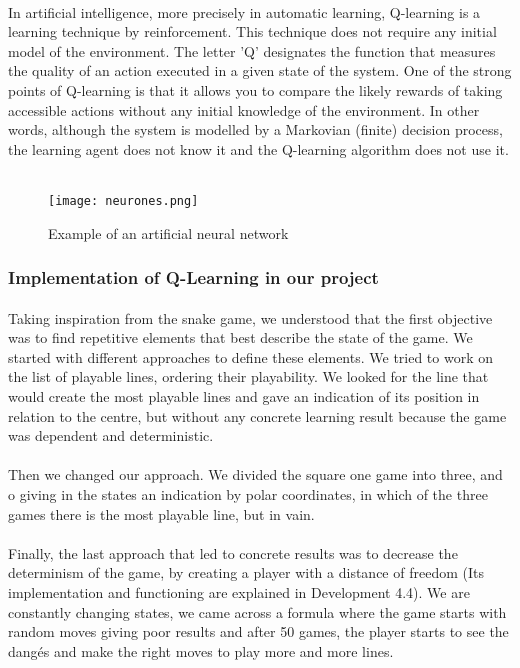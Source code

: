 \documentclass{article}
\begin{document}
\paragraph{}
\setlength{\parindent}{2cm}
In artificial intelligence, more precisely in automatic learning, Q-learning is a learning technique by reinforcement. This technique does not require any initial model of the environment. The letter 'Q' designates the function that measures the quality of an action executed in a given state of the system.
One of the strong points of Q-learning is that it allows you to compare the likely rewards of taking accessible actions without any initial knowledge of the environment. In other words, although the system is modelled by a Markovian (finite) decision process, the learning agent does not know it and the Q-learning algorithm does not use it. 
~\cite{learning} 
\newline
\begin{figure}[!h]
\centering
\texttt{[image: neurones.png]}
\\%
\caption{Example of an artificial neural network}
\end{figure}

\subsubsection{Implementation of Q-Learning in our project}
\paragraph{}
\setlength{\parindent}{2cm}
Taking inspiration from the snake game, we understood that the first objective was to find repetitive elements that best describe the state of the game. We started with different approaches to define these elements. We tried to work on the list of playable lines, ordering their playability. We looked for the line that would create the most playable lines and gave an indication of its position in relation to the centre, but without any concrete learning result because the game was dependent and deterministic.
\paragraph{}
\setlength{\parindent}{2cm}
Then we changed our approach. We divided the square one game into three, and o giving in the states an indication by polar coordinates, in which of the three games there is the most playable line, but in vain. 
\paragraph{}
\setlength{\parindent}{2cm}
Finally, the last approach that led to concrete results was to decrease the determinism of the game, by creating a player with a distance of freedom (Its implementation and functioning are explained in Development 4.4). We are constantly changing states, we came across a formula where the game starts with random moves giving poor results and after 50 games, the player starts to see the dangés and make the right moves to play more and more lines.
\newpage
\end{document}
